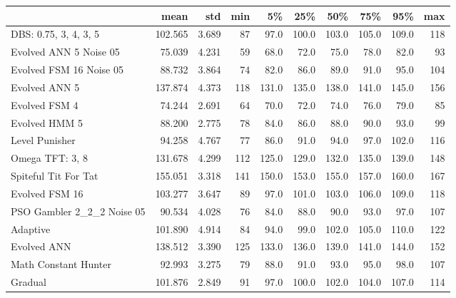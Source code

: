 \begin{tabular}{lrrrrrrrrr}
\toprule
{} &     mean &    std &  min &     5\% &    25\% &    50\% &    75\% &    95\% &  max \\
\midrule
DBS: 0.75, 3, 4, 3, 5      &  102.565 &  3.689 &   87 &   97.0 &  100.0 &  103.0 &  105.0 &  109.0 &  118 \\
Evolved ANN 5 Noise 05     &   75.039 &  4.231 &   59 &   68.0 &   72.0 &   75.0 &   78.0 &   82.0 &   93 \\
Evolved FSM 16 Noise 05    &   88.732 &  3.864 &   74 &   82.0 &   86.0 &   89.0 &   91.0 &   95.0 &  104 \\
Evolved ANN 5              &  137.874 &  4.373 &  118 &  131.0 &  135.0 &  138.0 &  141.0 &  145.0 &  156 \\
Evolved FSM 4              &   74.244 &  2.691 &   64 &   70.0 &   72.0 &   74.0 &   76.0 &   79.0 &   85 \\
Evolved HMM 5              &   88.200 &  2.775 &   78 &   84.0 &   86.0 &   88.0 &   90.0 &   93.0 &   99 \\
Level Punisher             &   94.258 &  4.767 &   77 &   86.0 &   91.0 &   94.0 &   97.0 &  102.0 &  116 \\
Omega TFT: 3, 8            &  131.678 &  4.299 &  112 &  125.0 &  129.0 &  132.0 &  135.0 &  139.0 &  148 \\
Spiteful Tit For Tat       &  155.051 &  3.318 &  141 &  150.0 &  153.0 &  155.0 &  157.0 &  160.0 &  167 \\
Evolved FSM 16             &  103.277 &  3.647 &   89 &   97.0 &  101.0 &  103.0 &  106.0 &  109.0 &  118 \\
PSO Gambler 2\_2\_2 Noise 05 &   90.534 &  4.028 &   76 &   84.0 &   88.0 &   90.0 &   93.0 &   97.0 &  107 \\
Adaptive                   &  101.890 &  4.914 &   84 &   94.0 &   99.0 &  102.0 &  105.0 &  110.0 &  122 \\
Evolved ANN                &  138.512 &  3.390 &  125 &  133.0 &  136.0 &  139.0 &  141.0 &  144.0 &  152 \\
Math Constant Hunter       &   92.993 &  3.275 &   79 &   88.0 &   91.0 &   93.0 &   95.0 &   98.0 &  107 \\
Gradual                    &  101.876 &  2.849 &   91 &   97.0 &  100.0 &  102.0 &  104.0 &  107.0 &  114 \\
\bottomrule
\end{tabular}

